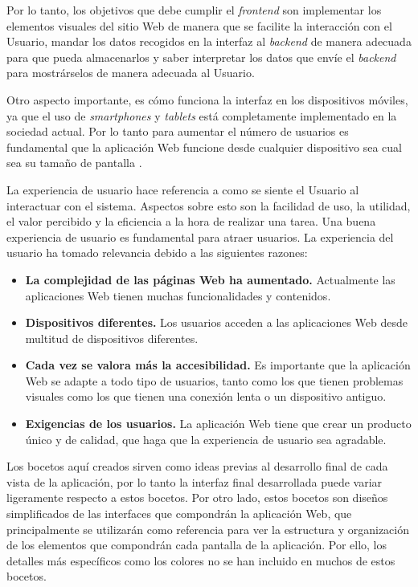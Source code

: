Por lo tanto, los objetivos que debe cumplir el \textit{frontend} son implementar los elementos visuales del sitio Web de manera que se facilite la interacción con el Usuario, mandar los datos recogidos en la interfaz al \textit{backend} de manera adecuada para que pueda almacenarlos y saber interpretar los datos que envíe el \textit{backend} para mostrárselos de manera adecuada al Usuario.



Otro aspecto importante, es cómo funciona la interfaz en los dispositivos móviles, ya que el uso de \textit{smartphones} y \textit{tablets} está completamente implementado en la sociedad actual. Por lo tanto para aumentar el número de usuarios es fundamental que la aplicación Web funcione desde cualquier dispositivo sea cual sea su tamaño de pantalla \cite{frontend-importancia}.

La experiencia de usuario \cite{experiencia-usuario} hace referencia a como se siente el Usuario al interactuar con el sistema. Aspectos sobre esto son la facilidad de uso, la utilidad, el valor percibido y la eficiencia a la hora de realizar una tarea. Una buena experiencia de usuario es fundamental para atraer usuarios. La experiencia del usuario ha tomado relevancia debido a las siguientes razones:

\begin{itemize}
    \item \textbf{La complejidad de las páginas Web ha aumentado.} Actualmente las aplicaciones Web tienen muchas funcionalidades y contenidos. 
    \item \textbf{Dispositivos diferentes.} Los usuarios acceden a las aplicaciones Web desde multitud de dispositivos diferentes.  
    \item \textbf{Cada vez se valora más la accesibilidad.} Es importante que la aplicación Web se adapte a todo tipo de usuarios, tanto como los que tienen problemas visuales como los que tienen una conexión lenta o un dispositivo antiguo.  
    \item \textbf{Exigencias de los usuarios.} La aplicación Web tiene que crear un producto único y de calidad, que haga que la experiencia de usuario sea agradable.  
\end{itemize}


Los bocetos aquí creados sirven como ideas previas al desarrollo final de cada vista de la aplicación, por lo tanto la interfaz final desarrollada puede variar ligeramente respecto a estos bocetos. Por otro lado, estos bocetos son diseños simplificados de las interfaces que compondrán la aplicación Web, que principalmente se utilizarán como referencia para ver la estructura y organización de los elementos que compondrán cada pantalla de la aplicación. Por ello, los detalles más específicos como los colores no se han incluido en muchos de estos bocetos. 

